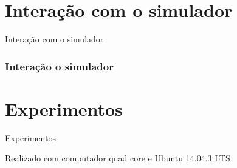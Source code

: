 \documentclass{beamer}
\begin{document}
\section{Interação com o simulador}
\begin{frame}
\begin{LARGE}
\begin{center}
Interação com o simulador
\end{center}
\end{LARGE}
\end{frame}


\begin{frame}
\frametitle{Interação o simulador}
\end{frame}




\section{Experimentos}
\begin{frame}
\begin{center}
\begin{LARGE}
Experimentos
\end{LARGE}

\begin{tiny}
Realizado com computador quad core e Ubuntu 14.04.3 LTS
\end{tiny}
\end{center}
\end{frame}
\end{document}

